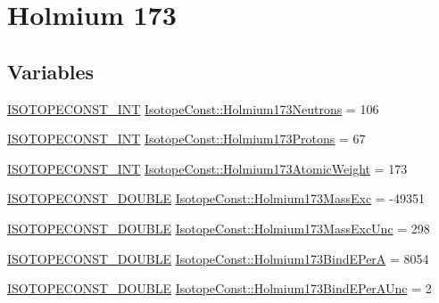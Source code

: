 \hypertarget{group___isotope_const-_holmium-_ho173}{}\section{Holmium 173}
\label{group___isotope_const-_holmium-_ho173}
\subsection*{Variables}
\begin{DoxyCompactItemize}
\item 
\mbox{\hyperlink{group___isotope_const-_macros_ga5f18360b3e99483a35c32d789e62621c}{I\+S\+O\+T\+O\+P\+E\+C\+O\+N\+S\+T\+\_\+\+I\+NT}} \mbox{\hyperlink{group___isotope_const-_holmium-_ho173_ga719f249c2b460e3b8d79f19a32a31cce}{Isotope\+Const\+::\+Holmium173\+Neutrons}} = 106
\item 
\mbox{\hyperlink{group___isotope_const-_macros_ga5f18360b3e99483a35c32d789e62621c}{I\+S\+O\+T\+O\+P\+E\+C\+O\+N\+S\+T\+\_\+\+I\+NT}} \mbox{\hyperlink{group___isotope_const-_holmium-_ho173_ga102e1c3ce5d91e3f0d18ea3a7c48b168}{Isotope\+Const\+::\+Holmium173\+Protons}} = 67
\item 
\mbox{\hyperlink{group___isotope_const-_macros_ga5f18360b3e99483a35c32d789e62621c}{I\+S\+O\+T\+O\+P\+E\+C\+O\+N\+S\+T\+\_\+\+I\+NT}} \mbox{\hyperlink{group___isotope_const-_holmium-_ho173_ga787717fe8e2a869a5706501192868481}{Isotope\+Const\+::\+Holmium173\+Atomic\+Weight}} = 173
\item 
\mbox{\hyperlink{group___isotope_const-_macros_ga8f45a7272ce02c0b4c65c44636ed719a}{I\+S\+O\+T\+O\+P\+E\+C\+O\+N\+S\+T\+\_\+\+D\+O\+U\+B\+LE}} \mbox{\hyperlink{group___isotope_const-_holmium-_ho173_ga6f04889b7fcb30e69cdda24b49f20dbe}{Isotope\+Const\+::\+Holmium173\+Mass\+Exc}} = -\/49351
\item 
\mbox{\hyperlink{group___isotope_const-_macros_ga8f45a7272ce02c0b4c65c44636ed719a}{I\+S\+O\+T\+O\+P\+E\+C\+O\+N\+S\+T\+\_\+\+D\+O\+U\+B\+LE}} \mbox{\hyperlink{group___isotope_const-_holmium-_ho173_gaa9d2e7ec412e77ceb4a7a67a2d56fcd5}{Isotope\+Const\+::\+Holmium173\+Mass\+Exc\+Unc}} = 298
\item 
\mbox{\hyperlink{group___isotope_const-_macros_ga8f45a7272ce02c0b4c65c44636ed719a}{I\+S\+O\+T\+O\+P\+E\+C\+O\+N\+S\+T\+\_\+\+D\+O\+U\+B\+LE}} \mbox{\hyperlink{group___isotope_const-_holmium-_ho173_gac6420527bf4813cfd605c01fb83e79b8}{Isotope\+Const\+::\+Holmium173\+Bind\+E\+PerA}} = 8054
\item 
\mbox{\hyperlink{group___isotope_const-_macros_ga8f45a7272ce02c0b4c65c44636ed719a}{I\+S\+O\+T\+O\+P\+E\+C\+O\+N\+S\+T\+\_\+\+D\+O\+U\+B\+LE}} \mbox{\hyperlink{group___isotope_const-_holmium-_ho173_gaa86fe779584d4318f7cdbbf8e7700664}{Isotope\+Const\+::\+Holmium173\+Bind\+E\+Per\+A\+Unc}} = 2

\end{DoxyCompactItemize}
